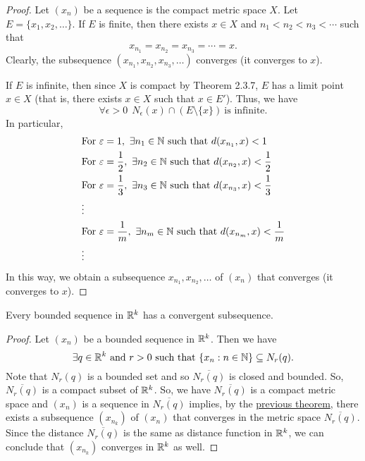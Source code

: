 \documentclass[a4paper]{book}
\begin{document}
\begin{proof}
Let \( ({x}_{n}) \) be a sequence is the compact metric space \( X  \). Let \( E = \{ {x}_{1}, {x}_{2}, \dots  \}  \). If \( E  \) is finite, then there exists \( x \in X  \) and \( {n}_{1} < {n}_{2} < {n}_{3} < \cdots     \) such that 
\[  {x}_{{n}_{1}} = {x}_{{n}_{2}} = {x}_{{n}_{3}} = \cdots = x. \]
Clearly, the subsequence \( ({x}_{{n}_{1}}, {x}_{{n}_{2}}, {x}_{{n}_{3}}, \dots ) \) converges (it converges to \( x  \)).

If \( E  \) is infinite, then since \( X  \) is compact by Theorem 2.3.7, \( E  \) has a limit point \( x \in X  \) (that is, there exists \( x \in X  \) such that \( x \in E' \)). Thus, we have 
\[  \forall \epsilon > 0 \ \ {N}_{\epsilon}(x) \cap (E \setminus  \{ x \} ) \ \text{is infinite.} \]
In particular, 
\begin{align*}
    &\text{For} \ \epsilon = 1, \ \exists {n}_{1} \in \N \ \text{such that} \ d({x}_{{n}_{1}}, x) < 1  \\
    &\text{For} \ \epsilon = \frac{ 1 }{ 2 } , \ \exists {n}_{2} \in \N \ \text{such that} \ d({x}_{{n}_{2}}, x) < \frac{ 1 }{ 2 }   \\
    &\text{For} \ \epsilon = \frac{ 1 }{ 3 } , \ \exists {n}_{3} \in \N \ \text{such that} \ d({x}_{{n}_{3}}, x) < \frac{ 1 }{ 3 }   \\
    &\vdots \\
    &\text{For} \ \epsilon = \frac{ 1 }{ m } , \ \exists {n}_{m} \in \N \ \text{such that} \ d({x}_{{n}_{m}}, x) < \frac{ 1 }{ m }   \\
    &\vdots
\end{align*}
In this way, we obtain a subsequence \( {x}_{{n}_{1}}, {x}_{{n}_{2}}, \dots  \) of \( ({x}_{n}) \) that converges (it converges to \( x \)). 
\end{proof}

\begin{corollary}
    Every bounded sequence in \( \mathbb{R}^{k} \) has a convergent subsequence.
\end{corollary}

\begin{proof}
Let \( ({x}_{n}) \) be a bounded sequence in \( \mathbb{R}^{k} \). Then we have
\[  \exists q \in \R^{k} \ \text{and} \ r > 0 \ \text{such that} \ \{ {x}_{n} : n \in \N  \} \subseteq {N}_{r}(q). \]
Note that \( {N}_{r}(q) \) is a bounded set and so \( \overline{{N}_{r}(q)} \) is closed and bounded. So, \( \overline{{N}_{r}(q)} \) is a compact subset of \( \mathbb{R}^{k} \). So, we have \( \overline{{N}_{r}(q)} \) is a compact metric space and \( ({x}_{n}) \) is a sequence in \( \overline{{N}_{r}(q)} \) implies, by the {\hyperref[SeqCompact]{previous theorem}}, there exists a subsequence \( ({x}_{{n}_{k}}) \) of \( ({x}_{n}) \) that converges in the metric space \( \overline{{N}_{r}(q)} \). Since the distance \( \overline{{N}_{r}(q)} \) is the same as distance function in \( \mathbb{R}^{k } \), we can conclude that \( ({x}_{{n}_{k}}) \) converges in \( \mathbb{R}^{k } \) as well.
\end{proof}
\end{document}
